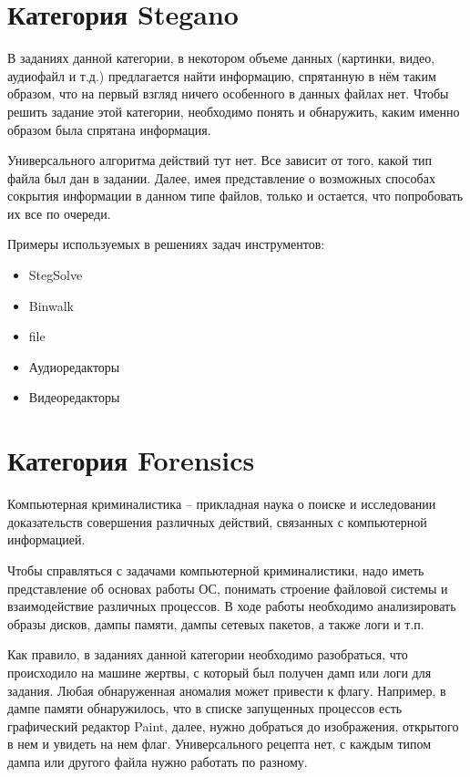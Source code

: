 


\section{Категория Stegano}

В заданиях данной категории, в некотором объеме данных (картинки, видео, аудиофайл и т.д.) предлагается найти информацию, спрятанную в нём таким образом, что на первый взгляд ничего особенного в данных файлах нет. Чтобы решить задание этой категории, необходимо понять и обнаружить, каким именно образом была спрятана информация.

Универсального алгоритма действий тут нет. Все зависит от того, какой тип файла был дан в задании. Далее, имея представление о возможных способах сокрытия информации в данном типе файлов, только и остается, что попробовать их все по очереди.

Примеры используемых в решениях задач инструментов:
\begin{itemize}
    \item StegSolve
    \item Binwalk
    \item file
    \item Аудиоредакторы
    \item Видеоредакторы
\end{itemize}



\section{Категория Forensics}

Компьютерная криминалистика – прикладная наука о поиске и исследовании доказательств совершения различных действий, связанных с компьютерной информацией.

Чтобы справляться с задачами компьютерной криминалистики, надо иметь представление об основах работы ОС, понимать строение файловой системы и взаимодействие различных процессов. В ходе работы необходимо анализировать образы дисков, дампы памяти, дампы сетевых пакетов, а также логи и т.п.

Как правило, в заданиях данной категории необходимо разобраться, что происходило на машине жертвы, с который был получен дамп или логи для задания. Любая обнаруженная аномалия может привести к флагу. Например, в дампе памяти обнаружилось, что в списке запущенных процессов есть графический редактор Paint, далее, нужно добраться до изображения, открытого в нем и увидеть на нем флаг. Универсального рецепта нет, с каждым типом дампа или другого файла нужно работать по разному.

